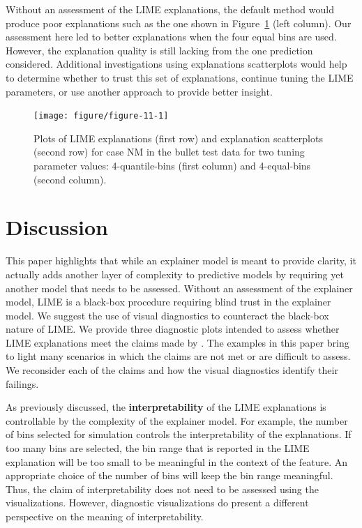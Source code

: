 \documentclass[AMS,STIX2COL]{WileyNJD-v2}\usepackage[]{graphicx}\usepackage[]{color}
\newenvironment{knitrout}{}{} %
\begin{document}
Without an assessment of the LIME explanations, the default method would produce poor explanations such as the one shown in Figure~\ref{fig:figure-11} (left column). Our assessment here led to better explanations when the four equal bins are used. However, the explanation quality is still lacking from the one prediction considered. Additional investigations using explanations scatterplots would help to determine whether to trust this set of explanations, continue tuning the LIME parameters, or use another approach to provide better insight.

\begin{figure}[!thp]
\begin{knitrout}
\color{fgcolor}

{\centering \texttt{[image: figure/figure-11-1]} 

}


\end{knitrout}
\caption{Plots of LIME explanations (first row) and explanation scatterplots (second row) for case NM in the bullet test data for two tuning parameter values: 4-quantile-bins (first column) and 4-equal-bins (second column).}
\label{fig:figure-11}
\end{figure}

\section{Discussion} \label{discussion}

This paper highlights that while an explainer model is meant to provide clarity, it actually adds another layer of complexity to predictive models by requiring yet another model that needs to be assessed. Without an assessment of the explainer model, LIME is a black-box procedure requiring blind trust in the explainer model. We suggest the use of visual diagnostics to counteract the black-box nature of LIME. We provide three diagnostic plots intended to assess whether LIME explanations meet the claims made by \citet{ribeiro:2016}. The examples in this paper bring to light many scenarios in which the claims are not met or are difficult to assess. We reconsider each of the claims and how the visual diagnostics identify their failings.

As previously discussed, the \textbf{interpretability} of the LIME explanations is controllable by the complexity of the explainer model. For example, the number of bins selected for simulation controls the interpretability of the explanations. If too many bins are selected, the bin range that is reported in the LIME explanation will be too small to be meaningful in the context of the feature. An appropriate choice of the number of bins will keep the bin range meaningful. Thus, the claim of interpretability does not need to be assessed using the visualizations. However, diagnostic visualizations do present a different perspective on the meaning of interpretability.
\end{document}
